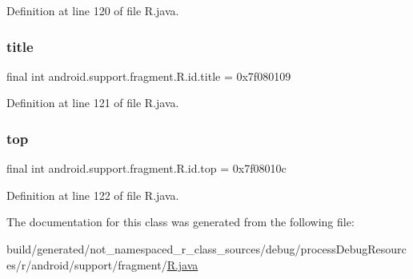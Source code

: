 Definition at line 120 of file R.\+java.

\mbox{\label{classandroid_1_1support_1_1fragment_1_1_r_1_1id_a796ac9208dc3433c3ab2d7a45f9f35fb}} 
\subsubsection{\texorpdfstring{title}{title}}
{\footnotesize\ttfamily final int android.\+support.\+fragment.\+R.\+id.\+title = 0x7f080109\hspace{0.3cm}{\ttfamily [static]}}



Definition at line 121 of file R.\+java.

\mbox{\label{classandroid_1_1support_1_1fragment_1_1_r_1_1id_a610fdd324f3b197216391211c720d444}} 
\subsubsection{\texorpdfstring{top}{top}}
{\footnotesize\ttfamily final int android.\+support.\+fragment.\+R.\+id.\+top = 0x7f08010c\hspace{0.3cm}{\ttfamily [static]}}



Definition at line 122 of file R.\+java.



The documentation for this class was generated from the following file\+:\begin{DoxyCompactItemize}
\item 
build/generated/not\+\_\+namespaced\+\_\+r\+\_\+class\+\_\+sources/debug/process\+Debug\+Resources/r/android/support/fragment/\mbox{\hyperlink{android_2support_2fragment_2_r_8java}{R.\+java}}\end{DoxyCompactItemize}
